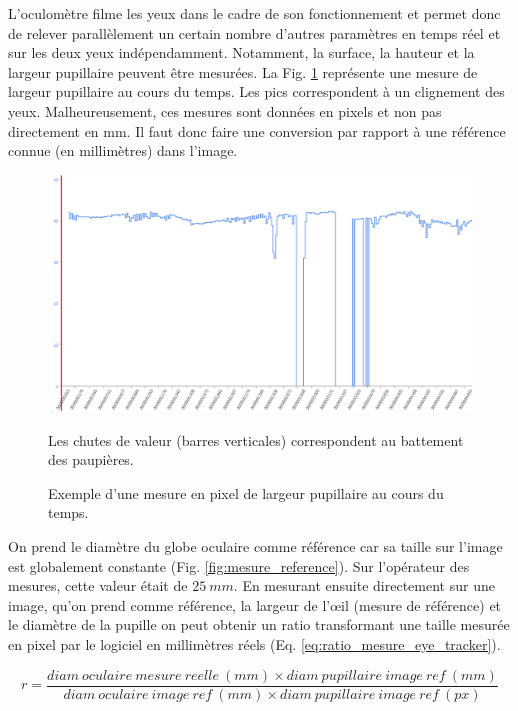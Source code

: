 	\par L'oculomètre filme les yeux dans le cadre de son fonctionnement et permet donc de relever parallèlement un certain nombre d'autres paramètres en temps réel et sur les deux yeux indépendamment. Notamment, la surface, la hauteur et la largeur pupillaire peuvent être mesurées. La Fig. \ref{fig:mesure_pupille} représente une mesure de largeur pupillaire au cours du temps. Les pics correspondent à un clignement des yeux. Malheureusement, ces mesures sont données en pixels et non pas directement en mm. Il faut donc faire une conversion par rapport à une référence connue (en millimètres) dans l'image.
	
	\begin{figure}[h]
		\centering
		\includegraphics[scale=.5]{Figures/LargeurPupillaireEnFonctionDuTemps}
		\caption{Exemple d'une mesure en pixel de largeur pupillaire au cours du temps.}{Les chutes de valeur (barres verticales) correspondent au battement des paupières.}
		\label{fig:mesure_pupille}
	\end{figure}
	
	\par On prend le diamètre du globe oculaire comme référence car sa taille sur l'image est globalement constante (Fig. \ref{fig:mesure_reference}). Sur l'opérateur des mesures, cette valeur était de $25~mm$. En mesurant ensuite directement sur une image, qu'on prend comme référence, la largeur de l'œil (mesure de référence) et le diamètre de la pupille on peut obtenir un ratio transformant une taille mesurée en pixel par le logiciel en millimètres réels (Eq. \ref{eq:ratio_mesure_eye_tracker}).
	
	\begin{equation}
		r = \frac{diam~oculaire~mesure~reelle~(mm) \times diam~pupillaire~image~ref~(mm)}{diam~oculaire~image~ref~(mm) \times diam~pupillaire~image~ref~(px)}
		\label{eq:ratio_mesure_eye_tracker}
	\end{equation}
	
